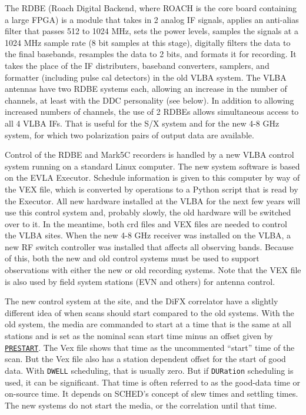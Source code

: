 \documentclass{report}
\newcommand{\sched}{{\sc SCHED}}
\begin{document}
The RDBE (Roach Digital Backend, where ROACH is the core board
containing a large FPGA) is a module that takes in 2 analog IF
signals, applies an anti-alias filter that passes 512 to 1024 MHz,
sets the power levels, samples the signals at a 1024 MHz sample rate
(8 bit samples at this stage), digitally filters the data to the final
basebands, resamples the data to 2 bits, and formats it for recording.
It takes the place of the IF distributers, baseband converters,
samplers, and formatter (including pulse cal detectors) in the old
VLBA system.  The VLBA antennas have two RDBE systems each, allowing
an increase in the number of channels, at least with the DDC
personality (see below).  In addition to allowing increased numbers of
channels, the use of 2 RDBEs allows simultaneous access to all 4 VLBA
IFs.  That is useful for the S/X system and for the new 4-8 GHz
system, for which two polarization pairs of output data are available.

Control of the RDBE and Mark5C recorders is handled by a new VLBA
control system running on a standard Linux computer.  The new system
software is based on the EVLA Executor.  Schedule information is given
to this computer by way of the VEX file, which is converted by
operations to a Python script that is read by the Executor.  All new
hardware installed at the VLBA for the next few years will use this
control system and, probably slowly, the old hardware will be switched
over to it.  In the meantime, both crd files and VEX files are needed
to control the VLBA sites.  When the new 4-8 GHz receiver was
installed on the VLBA, a new RF switch controller was installed that
affects all observing bands.  Because of this, both the new and old
control systems must be used to support observations with either the
new or old recording systems.  Note that the VEX file is also used by
field system stations (EVN and others) for antenna control.

The new control system at the site, and the DiFX correlator have a 
slightly different idea of when scans should start compared to the
old systems.  With the old system, the media are commanded to start
at a time that is the same at all stations and is set as the nominal
scan start time minus an offset given by 
{\hyperref[MP:PRESTART]{{\tt PRESTART}}}.
The Vex file shows that time as the uncommented 
``start'' time of the scan.  But the Vex file also has a station
dependent offset for the start of good data.  With {\tt DWELL}
scheduling, that is usually zero.  But if {\tt DURation} scheduling
is used, it can be significant.  That time is often referred to
as the good-data time or on-source time.  It depends on \sched's
concept of slew times and settling times.  The new systems do not 
start the media, or the correlation until that time.
\end{document}
